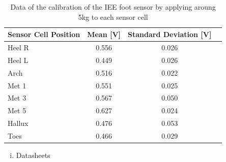 \begin{table}[!t]
	\renewcommand{\arraystretch}{1.3}
	\caption{Data of the calibration of the IEE foot sensor by applying aroung 5kg to each sensor cell}
	\label{tab: calibration}
	\centering
		\begin{tabular}{l|ccc}
			\hline
			Sensor Cell Position & Mean [V] & Standard Deviation [V] \\ \hline 
			Heel R  & 0.556 & 0.026  \\
			Heel L  & 0.449 & 0.026  \\
		    Arch & 0.516 & 0.022 \\
			Met 1 & 0.551 & 0.025  \\
			Met 3 & 0.567 & 0.050  \\
			Met 5 & 0.627 & 0.024  \\
		    Hallux & 0.476 & 0.053  \\		    	Toes & 0.466 & 0.029  \\

			\hline
		\end{tabular}
\end{table}

\cleardoublepage
\begin{enumerate}[iv.]
\item{Datasheets} 
\end{enumerate}



\label{subsec:HF ESP}



\label{subsec:HF Insole}




\label{subsec:HF ESP}




%
%


